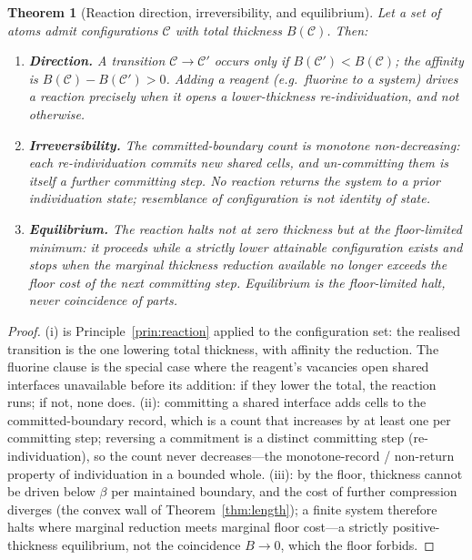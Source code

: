 \documentclass[11pt,a4paper]{article}
\theoremstyle{thmstyle}
\newtheorem{theorem}{Theorem}[section]
\theoremstyle{definition}
\theoremstyle{remark}
\newcommand{\floorc}{\beta}
\newcommand{\thick}{B}                 %
\begin{document}
\begin{theorem}[Reaction direction, irreversibility, and equilibrium]
\label{thm:reaction}
Let a set of atoms admit configurations $\mathcal{C}$ with total
thickness $\thick(\mathcal{C})$. Then:
\begin{enumerate}[label=\textup{(\roman*)},leftmargin=2.2em]
\item \textbf{Direction.} A transition $\mathcal{C}\to\mathcal{C}'$
occurs only if $\thick(\mathcal{C}')<\thick(\mathcal{C})$; the affinity is
$\thick(\mathcal{C})-\thick(\mathcal{C}')>0$. Adding a reagent (e.g.\
fluorine to a system) drives a reaction precisely when it opens a
lower-thickness re-individuation, and not otherwise.
\item \textbf{Irreversibility.} The committed-boundary count is monotone
non-decreasing: each re-individuation commits new shared cells, and
un-committing them is itself a further committing step. No reaction
returns the system to a prior individuation state; resemblance of
configuration is not identity of state.
\item \textbf{Equilibrium.} The reaction halts not at zero thickness but
at the floor-limited minimum: it proceeds while a strictly lower
attainable configuration exists and stops when the marginal thickness
reduction available no longer exceeds the floor cost of the next
committing step. Equilibrium is the floor-limited halt, never coincidence
of parts.
\end{enumerate}
\end{theorem}

\begin{proof}
(i) is Principle~\ref{prin:reaction} applied to the configuration set: the
realised transition is the one lowering total thickness, with affinity the
reduction. The fluorine clause is the special case where the reagent's
vacancies open shared interfaces unavailable before its addition: if they
lower the total, the reaction runs; if not, none does. (ii): committing a
shared interface adds cells to the committed-boundary record, which is a
count that increases by at least one per committing step; reversing a
commitment is a distinct committing step (re-individuation), so the count
never decreases---the monotone-record / non-return property of individuation
in a bounded whole. (iii): by the floor, thickness cannot be driven below
$\floorc$ per maintained boundary, and the cost of further compression
diverges (the convex wall of Theorem~\ref{thm:length}); a finite system
therefore halts where marginal reduction meets marginal floor cost---a
strictly positive-thickness equilibrium, not the coincidence
$\thick\to0$, which the floor forbids.
\end{proof}
\end{document}
